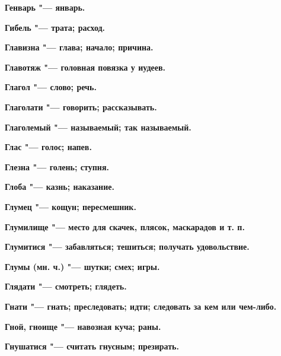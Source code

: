 \bfseries Генварь \normalfont{} "--- январь. 




\bfseries Гибель \normalfont{} "--- трата; расход. 




\bfseries Главизна \normalfont{} "--- глава; начало; причина. 




\bfseries Главотяж \normalfont{} "--- головная повязка у иудеев. 




\bfseries Глагол \normalfont{} "--- слово; речь. 




\bfseries Глаголати \normalfont{} "--- говорить; рассказывать. 




\bfseries Глаголемый \normalfont{} "--- называемый; так называемый. 




\bfseries Глас \normalfont{} "--- голос; напев. 




\bfseries Глезна \normalfont{} "--- голень; ступня. 




\bfseries Глоба \normalfont{} "--- казнь; наказание. 




\bfseries Глумец \normalfont{} "--- кощун; пересмешник. 




\bfseries Глумилище \normalfont{} "--- место для скачек, плясок, маскарадов и т. п. 




\bfseries Глумитися \normalfont{} "--- забавляться; тешиться; получать удовольствие. 




\bfseries Глумы \normalfont{} (мн. ч.) "--- шутки; смех; игры. 




\bfseries Глядати \normalfont{} "--- смотреть; глядеть. 




\bfseries Гнати \normalfont{} "--- гнать; преследовать; идти; следовать за кем или чем-либо. 




\bfseries Гной, гноище \normalfont{} "--- навозная куча; раны. 




\bfseries Гнушатися \normalfont{} "--- считать гнусным; презирать. 




